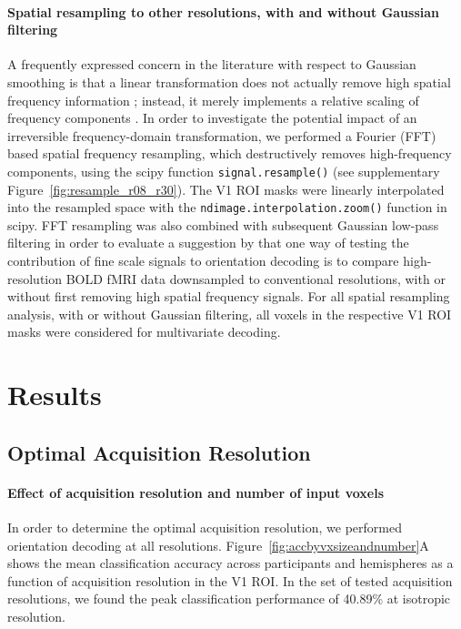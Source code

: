 \paragraph{Spatial resampling to other resolutions, with and without Gaussian
filtering}
%
A frequently expressed concern in the literature with respect to Gaussian
smoothing is that a linear transformation does not actually remove high spatial
frequency information \citep{alink_2013,kamitani_2010}; instead, it merely
implements a relative scaling of frequency components
\citep[see][]{misaki_2013}. In order to investigate the potential impact of
an irreversible frequency-domain transformation, we performed a Fourier (FFT) based spatial
frequency resampling, which destructively removes high-frequency components,
using the scipy function \texttt{signal.resample()}
\citep{scipy_2001}(see supplementary Figure~\ref{fig:resample_r08_r30}). The V1 ROI
masks were linearly interpolated into the resampled space with the 
\texttt{ndimage.interpolation.zoom()} function in scipy. FFT resampling was
also combined with subsequent Gaussian low-pass filtering in order to evaluate
a suggestion by \citet{freeman_2013} that one way of testing the contribution
of fine scale signals to orientation decoding is to compare high-resolution
BOLD fMRI data downsampled to conventional resolutions, with or without first
removing high spatial frequency signals. For all spatial resampling analysis,
with or without Gaussian filtering, all voxels in the respective V1 ROI masks 
were considered for multivariate decoding.

\section*{Results}

\subsection*{Optimal Acquisition Resolution}

\paragraph*{Effect of acquisition resolution and number of input voxels}
%
In order to determine the optimal acquisition resolution, we performed
orientation decoding at all resolutions. Figure~\ref{fig:accbyvxsizeandnumber}A
shows the mean classification accuracy across participants and hemispheres as a
function of acquisition resolution in the V1 ROI. In the set of tested
acquisition resolutions, we found the peak classification performance of
40.89\% at  isotropic resolution. 


